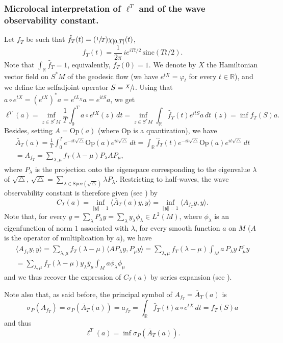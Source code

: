 \documentclass[JEP,XML,SOM,Unicode, NoEqCountersInSection,NoFloatCountersInSection,published]{cedram}
\newcommand{\Psfrac}[2]{(\sfrac{#1}{#2})}
\def\R{\mathbb{R}}
\newcommand{\Op}{\mathrm{Op}}
\theoremstyle{definition}
\begin{document}
\subsubsection*{Microlocal interpretation of $\ell^T$ and of the wave observability constant.}
Let $f_T$ be such that $\hat f_T(t) = \Psfrac{1}{T}\chi_{[0,T]}(t)$, \ie
\[
f_T(t)=\frac{1}{2\pi}\,ie^{iTt/2}\,\mathrm{sinc}(Tt/2).
\]
Note that $\int_\R \hat f_T=1$, \ie equivalently, $f_T(0)=1$.
We denote by $X$ the Hamiltonian vector field on $S^*M$ of the geodesic flow (we have $e^{tX}=\varphi_t$ for every $t\in\R$), and we define the selfadjoint operator $S=\sfrac{X}{i}$.
Using that $a\circ e^{tX} = (e^{tX})^*a=e^{tL_X}a=e^{itS}a$, we get
\[
\ell^T(a) = \inf_{z\in S^*M} \frac{1}{T} \int_0^T a\circ e^{tX}(z)\, dt
= \inf_{z\in S^*M} \int_\R \hat f_T(t) e^{itS}a\, dt\ (z)
= \inf f_T(S)a.
\]
Besides, setting $A=\Op(a)$ (where $\Op$ is a quantization), we have
\begin{multline*}
\bar A_T(a) = \frac{1}{T} \int_0^T e^{-it\sqrt{\triangle}} \Op(a) e^{it\sqrt{\triangle}}\, dt
= \int_\R \hat f_T(t) e^{-it\sqrt{\triangle}} \Op(a) e^{it\sqrt{\triangle}}\, dt \\
= A_{f_T} = \sum_{\lambda,\mu} f_T(\lambda-\mu) P_\lambda A P_\mu,
\end{multline*}
{where $P_\lambda$ is the projection onto the eigenspace corresponding to the eigenvalue $\lambda$ of $\sqrt{\triangle}$, \ie $\sqrt{\triangle} = \sum_{\lambda\in\mathrm{Spec}(\sqrt{\triangle})} \lambda P_\lambda$.}
Restricting to half-waves, the wave observability constant is therefore given (see \cite{hpt}) by
\[
C_T(a) = \inf_{\Vert y\Vert=1} \langle \bar A_T(a) y,y\rangle = \inf_{\Vert y\Vert=1} \langle A_{f_T} y,y\rangle.
\]
Note that, {for every $y=\sum_\lambda P_\lambda y=\sum_\lambda y_\lambda\phi_\lambda\in L^2(M)$, where $\phi_\lambda$ is an eigenfunction of norm $1$ associated with $\lambda$, for every smooth function $a$ on $M$ (\ie $A$ is the operator of multiplication by $a$), we have}
\begin{multline*}
\langle A_{f_T} y,y\rangle = \sum_{\lambda,\mu} f_T(\lambda-\mu) \langle AP_\lambda y, P_\mu y\rangle
= \sum_{\lambda,\mu} f_T(\lambda-\mu) \int_M a \, P_\lambda y\, \overline{P_\mu y} \\
= \sum_{\lambda,\mu} f_T(\lambda-\mu) y_\lambda \bar y_\mu \int_M a \phi_\lambda \phi_\mu
\end{multline*}
and we thus recover the expression of $C_T(a)$ by series expansion (see \cite{hpt}).

Note also that, as said before, the principal symbol of $A_{f_T}=\bar A_T(a)$ is
\[
\sigma_P(A_{f_T}) = \sigma_P(\bar A_T(a)) = a_{f_T} = \int_\R \hat f_T(t) a\circ e^{tX}\, dt = f_T(S)a
\]
and thus
\[
\ell^T(a) = \inf \sigma_P(\bar A_T(a)).
\]
\end{document}
